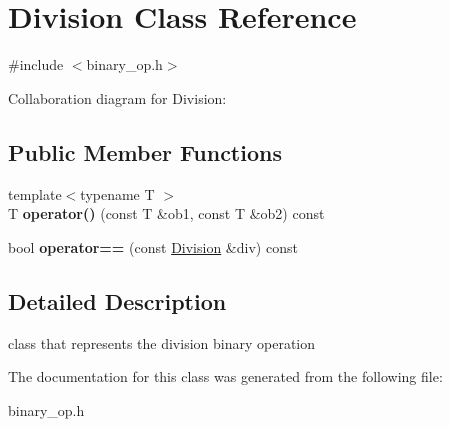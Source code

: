 \hypertarget{classDivision}{\section{Division Class Reference}
\label{classDivision}
}


{\ttfamily \#include $<$binary\-\_\-op.\-h$>$}



Collaboration diagram for Division\-:
\subsection*{Public Member Functions}
\begin{DoxyCompactItemize}
\item 
\hypertarget{classDivision_a5b6503a6d97997e1a45917dfb1a777f7}{{\footnotesize template$<$typename T $>$ }\\T {\bfseries operator()} (const T \&ob1, const T \&ob2) const }\label{classDivision_a5b6503a6d97997e1a45917dfb1a777f7}

\item 
\hypertarget{classDivision_a2e4ddbb767269af11599fff804914910}{bool {\bfseries operator==} (const \hyperlink{classDivision}{Division} \&div) const }\label{classDivision_a2e4ddbb767269af11599fff804914910}

\end{DoxyCompactItemize}


\subsection{Detailed Description}
class that represents the division binary operation 

The documentation for this class was generated from the following file\-:\begin{DoxyCompactItemize}
\item 
binary\-\_\-op.\-h\end{DoxyCompactItemize}
